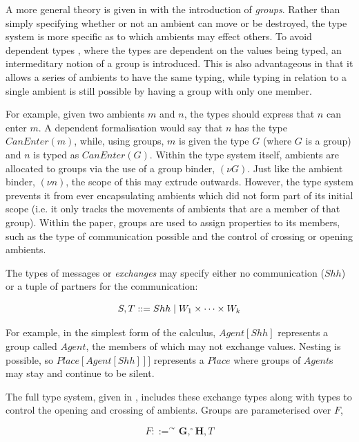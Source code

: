 A more general theory is given in \cite{ambienttypes} with the
introduction of \emph{groups}.  Rather than simply specifying whether or
not an ambient can move or be destroyed, the type system is more
specific as to which ambients may effect others.  To avoid dependent
types \cite{deptypes}, where the types are dependent on the values being
typed, an intermeditary notion of a group is introduced.  This is also
advantageous in that it allows a series of ambients to have the same
typing, while typing in relation to a single ambient is still possible
by having a group with only one member.

For example, given two ambients $m$ and $n$, the types should express
that $n$ can enter $m$.  A dependent formalisation would say that $n$
has the type $CanEnter(m)$, while, using groups, $m$ is given the type
$G$ (where $G$ is a group) and $n$ is typed as $CanEnter(G)$.  Within
the type system itself, ambients are allocated to groups via the use of
a group binder, $(\nu G)$.  Just like the ambient binder, $(\nu n)$,
the scope of this may extrude outwards.  However, the type system
prevents it from ever encapsulating ambients which did not form part of
its initial scope (i.e. it only tracks the movements of ambients that
are a member of that group).  Within the paper, groups are used to
assign properties to its members, such as the type of communication
possible and the control of crossing or opening ambients.

The types of messages or \emph{exchanges} may specify either no
communication ($Shh$) or a tuple of partners for the communication:

\begin{equation}
S, T ::= Shh \;|\; W_1 \times \dots \times W_k
\end{equation}

\noindent For example, in the simplest form of the calculus,
$Agent[Shh]$ represents a group called $Agent$, the members of which may
not exchange values.  Nesting is possible, so $Place[Agent[Shh]]]$
represents a $Place$ where groups of $Agent$s may stay and continue to
be silent.

The full type system, given in \cite{ambienttypes}, includes these
exchange types along with types to control the opening and crossing of
ambients.  Groups are parameterised over $F$,

\begin{equation}
F ::= ^\curvearrowright \mathbf{G}, ^\circ \mathbf{H}, T
\end{equation}


